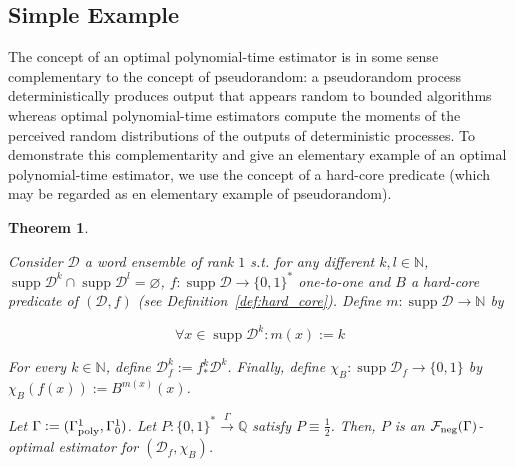 \documentclass{article}
\numberwithin{equation}{section}
\theoremstyle{definition}
\theoremstyle{plain}
\newtheorem{theorem}{Theorem}[section]
\newcommand{\Bool}{\{0,1\}}
\newcommand{\Words}{{\Bool^*}}
\DeclareMathOperator{\Supp}{supp}
\newcommand{\Nats}{\mathbb{N}}
\newcommand{\Rats}{\mathbb{Q}}
\newcommand{\Dist}{\mathcal{D}}
\newcommand{\Fall}{\mathcal{F}}
\newcommand{\GammaPoly}{\Gamma_{\textnormal{poly}}}
\newcommand{\Scheme}{\xrightarrow{\Gamma}}
\begin{document}
\subsection{Simple Example}
\label{sec:fundamentals__one_way}

The concept of an optimal polynomial-time estimator is in some sense complementary to the concept of pseudorandom: a pseudorandom process deterministically produces output that appears random to bounded algorithms whereas optimal polynomial-time estimators compute the moments of the perceived random distributions of the outputs of deterministic processes. To demonstrate this complementarity and give an elementary example of an optimal polynomial-time estimator, we use the concept of a hard-core predicate (which may be regarded as en elementary example of pseudorandom).

\begin{theorem}
\label{thm:hard_core}

Consider $\Dist$ a word ensemble of rank ${1}$ s.t. for any different $k,l \in \Nats$,\\ ${\Supp \Dist^k \cap \Supp \Dist^l = \varnothing}$, ${f: \Supp \Dist \rightarrow \Words}$ one-to-one and $B$ a hard-core predicate of $(\Dist,f)$ (see Definition~\ref{def:hard_core}). Define ${m: \Supp \Dist \rightarrow \Nats}$ by 

\[\forall x \in \Supp \Dist^k: m(x):=k\]

For every $k \in \Nats$, define ${\Dist_f^k:=f_*^k\Dist^k}$.  Finally, define ${\chi_B: \Supp \Dist_f \rightarrow \Bool}$ by ${\chi_B(f(x)):=B^{m(x)}(x)}$.

Let $\Gamma:=(\GammaPoly^1,\Gamma_0^1)$. Let $P: \Words \Scheme \Rats$ satisfy $P \equiv \frac{1}{2}$. Then, $P$ is an $\Fall_{\textnormal{neg}}(\Gamma)$-optimal estimator for $(\Dist_f, \chi_B)$.

\end{theorem}
\end{document}
